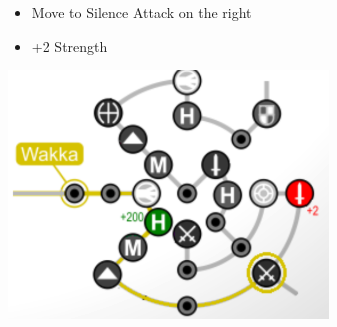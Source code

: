 \begin{spheregrid}
\begin{itemize}
\begin{itemize}
		\item Move to Silence Attack on the right
		\item +2 Strength
	\end{itemize}
	\includegraphics{graphics/wakkammr}
	\end{itemize}
\end{spheregrid}

